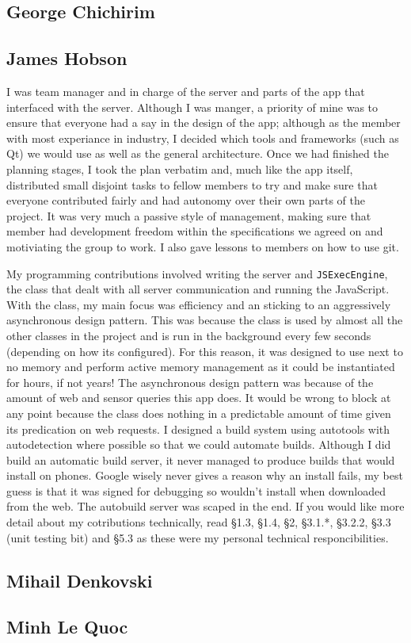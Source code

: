 \documentclass{article}
\begin{document}
\subsection{George Chichirim}
\subsection{James Hobson}
I was team manager and in charge of the server and parts of the app that interfaced with the server. Although I was manger, a priority of mine
was to ensure that everyone had a say in the design of the app; although as the member with most experiance in industry, I decided which tools
and frameworks (such as Qt) we would use as well as the general architecture. Once we had finished the planning stages, I took the plan verbatim and,
much like the app itself, distributed small disjoint tasks to fellow members to try and make sure that everyone contributed fairly
and had autonomy over their own parts of the project. It was very much a passive style of management, making sure that member had development freedom
within the specifications we agreed on and motiviating the group to work. I also gave lessons to members on how to use git.

My programming contributions involved writing the server and \texttt{JSExecEngine}, the class that dealt with all server communication and
running the JavaScript. With the class, my main focus was efficiency and an sticking to an aggressively asynchronous design pattern. This was
because the class is used by almost all the other classes in the project and is run in the background every few seconds (depending on how its configured).
For this reason, it was designed to use next to no memory and perform active memory management as it could be instantiated for hours, if not years!
The asynchronous design pattern was because of the amount of web and sensor queries this app does. It would be wrong to block at any point because
the class does nothing in a predictable amount of time given its predication on web requests. I designed a build system using autotools
with autodetection where possible so that we could automate builds. Although I did build an automatic build server, it never managed to 
produce builds that would install on phones. Google wisely never gives a reason why an install fails, my best guess is that it was signed for debugging
so wouldn't install when downloaded from the web. The autobuild server was scaped in the end. If you would like more detail about my cotributions
technically, read §1.3, §1.4, §2, §3.1.*, §3.2.2, §3.3 (unit testing bit) and §5.3 as these were my personal technical responcibilities.
\subsection{Mihail Denkovski}
\subsection{Minh Le Quoc}
\end{document}
